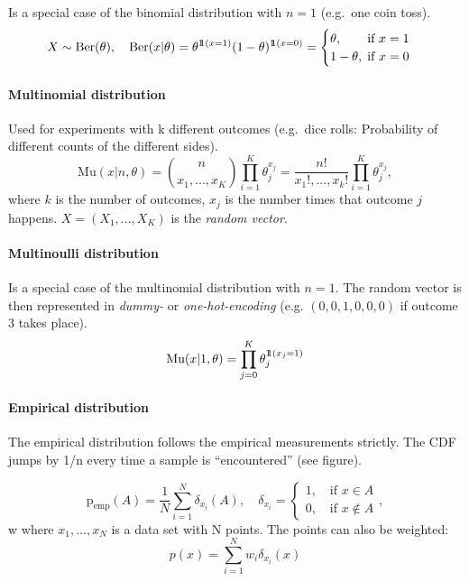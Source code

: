 \documentclass[
]{book}
\begin{document}
Is a special case of the binomial distribution with \(n=1\) (e.g.~one coin
toss).
\[X \sim \text{Ber}(\theta ), \quad \text{Ber}(x | \theta)=\theta^{1 \mkern-6mu 1 (x=1)} (1-\theta)^{1 \mkern-6mu 1(x=0)}= \begin{cases}
                    \theta, \qquad \text{if } x=1 \\
                    1 - \theta, \; \text{if } x=0
                \end{cases}\]

\hypertarget{multinomial-distribution}{%
\paragraph{Multinomial distribution}\label{multinomial-distribution}}

Used for experiments with k different outcomes (e.g.~dice rolls:
Probability of different counts of the different sides).
\[\text{Mu}(x|n,\theta) =  {n \choose x_1, ..., x_K}\prod_{i=1}^K\theta_j^{x_j} = \frac{n!}{x_1!, ..., x_k!}\prod_{i=1}^K\theta_j^{x_j},\]
where \(k\) is the number of outcomes, \(x_j\) is the number times that
outcome \(j\) happens. \(X = (X_1, ..., X_K)\) is the \emph{random vector}.

\hypertarget{multinoulli-distribution}{%
\paragraph{Multinoulli distribution}\label{multinoulli-distribution}}

Is a special case of the multinomial distribution with \(n=1\). The random
vector is then represented in \emph{dummy-} or \emph{one-hot-encoding} (e.g.
\((0,0,1,0,0,0)\) if outcome 3 takes place).
\[\text{Mu}(x|1,\theta) = \prod_{j=0}^K \theta_j^{1 \mkern-6mu 1(x_j=1)}\]

\hypertarget{empirical-distribution}{%
\paragraph{Empirical distribution}\label{empirical-distribution}}

The empirical distribution follows the empirical measurements strictly.
The CDF jumps by 1/n every time a sample is ``encountered'' (see figure).

\[\text{p}_{\text{emp}}(A) = \frac{1}{N} \sum_{i=1}^N \delta_{x_i}(A), \quad \delta_{x_i}=\begin{cases}1, \quad \text{if } x \in A \\0, \quad \text{if } x \notin A \end{cases},\]
w where \(x_1, ..., x_N\) is a data set with N points. The points can also
be weighted: \[p(x) =  \sum_{i=1}^N w_i \delta_{x_i}(x)\]
\end{document}
